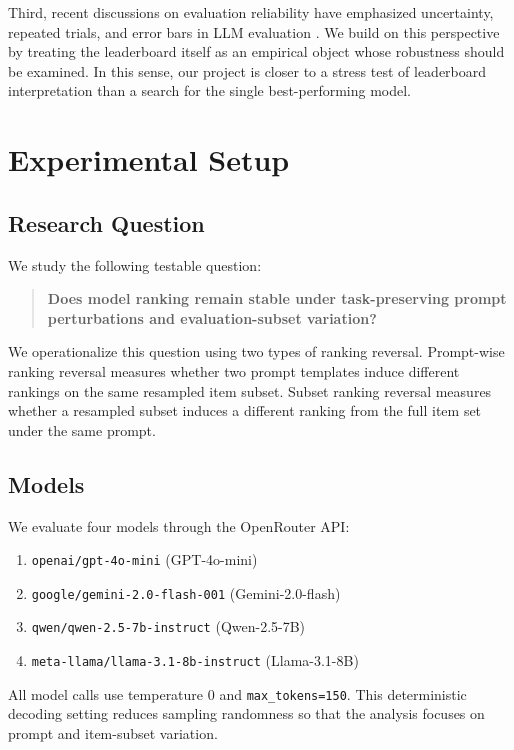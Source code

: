 \documentclass[11pt]{article}
\theoremstyle{definition}
\begin{document}
Third, recent discussions on evaluation reliability have emphasized uncertainty, repeated trials, and error bars in LLM evaluation \cite{miller2024errorbars, fourrier2024openllm}. We build on this perspective by treating the leaderboard itself as an empirical object whose robustness should be examined. In this sense, our project is closer to a stress test of leaderboard interpretation than a search for the single best-performing model.

\section{Experimental Setup}

\subsection{Research Question}

We study the following testable question:
\begin{quote}
    \textbf{Does model ranking remain stable under task-preserving prompt perturbations and evaluation-subset variation?}
\end{quote}

We operationalize this question using two types of ranking reversal. Prompt-wise ranking reversal measures whether two prompt templates induce different rankings on the same resampled item subset. Subset ranking reversal measures whether a resampled subset induces a different ranking from the full item set under the same prompt.

\subsection{Models}

We evaluate four models through the OpenRouter API:
\begin{enumerate}[leftmargin=3.75em]
    \item \texttt{openai/gpt-4o-mini} (GPT-4o-mini)
    \item \texttt{google/gemini-2.0-flash-001} (Gemini-2.0-flash)
    \item \texttt{qwen/qwen-2.5-7b-instruct} (Qwen-2.5-7B)
    \item \texttt{meta-llama/llama-3.1-8b-instruct} (Llama-3.1-8B)
\end{enumerate}

All model calls use temperature $0$ and \texttt{max\_tokens=150}. This deterministic decoding setting reduces sampling randomness so that the analysis focuses on prompt and item-subset variation.
\end{document}
